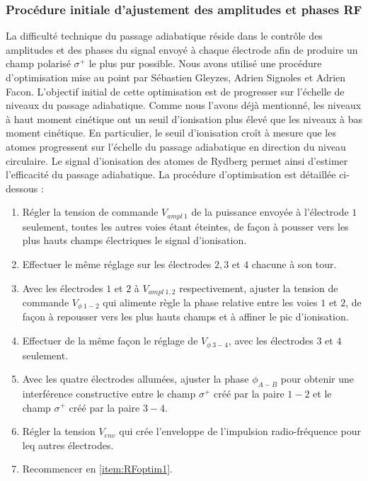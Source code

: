 \subsubsection*{Procédure initiale d'ajustement des amplitudes et phases RF}
\noindent La difficulté technique du passage adiabatique réside dans le contrôle des amplitudes et des phases du signal envoyé à chaque électrode afin de produire un champ polarisé $\sigma^+$ le plus pur possible.
Nous avons utilisé une procédure d'optimisation mise au point par Sébastien Gleyzes, Adrien Signoles et Adrien Facon.
L'objectif initial de cette optimisation est de progresser sur l'échelle de niveaux du passage adiabatique.
Comme nous l'avons déjà mentionné, les niveaux à haut moment cinétique ont un seuil d'ionisation plus élevé que les niveaux à bas moment cinétique.
En particulier, le seuil d'ionisation croît à mesure que les atomes progressent sur l'échelle du passage adiabatique en direction du niveau circulaire.
Le signal d'ionisation des atomes de Rydberg permet ainsi d'estimer l'efficacité du passage adiabatique.
%
La procédure d'optimisation est détaillée ci-dessous :
%
\begin{enumerate}
\item \label{item:RFoptim1} Régler la tension de commande $V_{ampl~1}$ de la puissance envoyée à l'électrode $1$ seulement, toutes les autres voies étant éteintes, de façon à pousser vers les plus hauts champs électriques le signal d'ionisation.
\item Effectuer le même réglage sur les électrodes $2,3$ et $4$ chacune à son tour.
\item Avec les électrodes $1$ et $2$ à $V_{ampl~1,2}$ respectivement, ajuster la tension de commande $V_{\phi~1-2}$ qui alimente règle la phase relative entre les voies $1$ et $2$, de façon à repousser vers les plus hauts champs et à affiner le pic d'ionisation.
\item Effectuer de la même façon le réglage de $V_{\phi~3-4}$, avec les électrodes $3$ et $4$ seulement.
\item Avec les quatre électrodes allumées, ajuster la phase $\phi_{A-B}$ pour obtenir une interférence constructive entre le champ $\sigma^+$ créé par la paire $1-2$ et le champ $\sigma^+$ créé par la paire $3-4$.
\item Régler la tension $V_{env}$ qui crée l'enveloppe de l'impulsion radio-fréquence pour leq autres électrodes.
\item Recommencer en \ref{item:RFoptim1}.
\end{enumerate}

